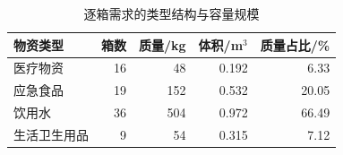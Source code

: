\begin{table}[htbp]\centering\small
\caption{逐箱需求的类型结构与容量规模}\label{tab:rev_cargo}
\begin{tabular}{lrrrr}\toprule
物资类型 & 箱数 & 质量/kg & 体积/m$^3$ & 质量占比/\%\\\midrule
医疗物资 & 16 & 48 & 0.192 & 6.33\\
应急食品 & 19 & 152 & 0.532 & 20.05\\
饮用水 & 36 & 504 & 0.972 & 66.49\\
生活卫生用品 & 9 & 54 & 0.315 & 7.12\\
\bottomrule\end{tabular}
\end{table}
